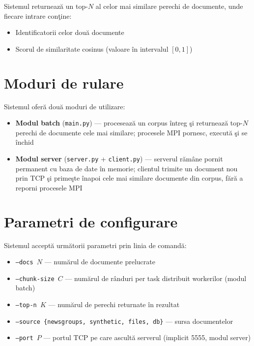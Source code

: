 \documentclass[a4paper,12pt]{report}
\begin{document}
Sistemul returneaz\u{a} un top-$N$ al celor mai similare perechi de documente, unde fiecare intrare con\c{t}ine:
\begin{itemize}
  \item Identificatorii celor dou\u{a} documente
  \item Scorul de similaritate cosinus (valoare \^{i}n intervalul $[0, 1]$)
\end{itemize}

\section{Moduri de rulare}

Sistemul ofer\u{a} dou\u{a} moduri de utilizare:

\begin{itemize}
  \item \textbf{Modul batch} (\texttt{main.py}) — proceseaz\u{a} un corpus \^{i}ntreg \c{s}i returneaz\u{a} top-$N$ perechi de documente cele mai similare; procesele MPI pornesc, execut\u{a} \c{s}i se \^{i}nchid
  \item \textbf{Modul server} (\texttt{server.py} + \texttt{client.py}) — serverul r\u{a}m\^{a}ne pornit permanent cu baza de date \^{i}n memorie; clientul trimite un document nou prin TCP \c{s}i prime\c{s}te \^{i}napoi cele mai similare documente din corpus, f\u{a}r\u{a} a reporni procesele MPI
\end{itemize}

\section{Parametri de configurare}

Sistemul accept\u{a} urm\u{a}torii parametri prin linia de comand\u{a}:
\begin{itemize}
  \item \texttt{--docs $N$} — num\u{a}rul de documente prelucrate
  \item \texttt{--chunk-size $C$} — num\u{a}rul de r\^{a}nduri per task distribuit workerilor (modul batch)
  \item \texttt{--top-n $K$} — num\u{a}rul de perechi returnate \^{i}n rezultat
  \item \texttt{--source \{newsgroups, synthetic, files, db\}} — sursa documentelor
  \item \texttt{--port $P$} — portul TCP pe care ascult\u{a} serverul (implicit 5555, modul server)
\end{itemize}
\end{document}
